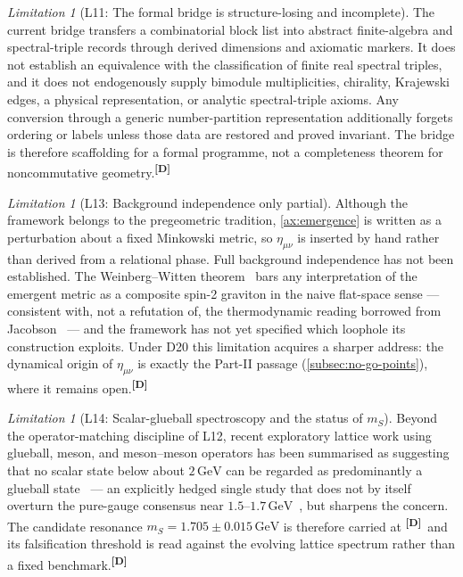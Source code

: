 \documentclass[12pt,a4paper,twoside]{article}
\theoremstyle{plain}
\theoremstyle{definition}
\theoremstyle{remark}
\newtheorem{limitation}[theorem]{Limitation}
\newcommand{\GeV}{\,\mathrm{GeV}}
\newcommand{\catmark}[1]{\textsuperscript{\textsf{\textbf{[#1]}}}}
\begin{document}
\begin{limitation}[L11: The formal bridge is structure-losing and incomplete]
\label{lim:L11}
The current bridge transfers a combinatorial block list into abstract
finite-algebra and spectral-triple records through derived dimensions
and axiomatic markers. It does not establish an equivalence with the
classification of finite real spectral triples, and it does not
endogenously supply bimodule multiplicities, chirality, Krajewski edges,
a physical representation, or analytic spectral-triple axioms. Any
conversion through a generic number-partition representation additionally
forgets ordering or labels unless those data are restored and proved
invariant. The bridge is therefore scaffolding for a formal programme,
not a completeness theorem for noncommutative geometry.\catmark{D}
\end{limitation}

\begin{limitation}[L13: Background independence only partial]
\label{lim:L13}
Although the framework belongs to the pregeometric tradition,
\cref{ax:emergence} is written as a perturbation about a fixed Minkowski
metric, so $\eta_{\mu\nu}$ is inserted by hand rather than derived from
a relational phase. Full background independence has not been
established. The Weinberg--Witten theorem~\cite{weinbergwitten1980} bars any interpretation of the
emergent metric as a composite spin-2 graviton in the naive flat-space
sense --- consistent with, not a refutation of, the thermodynamic
reading borrowed from Jacobson~\cite{jenkins2009,carlip2014} --- and the framework has not yet
specified which loophole its construction exploits. Under D20 this
limitation acquires a sharper address: the dynamical origin of
$\eta_{\mu\nu}$ is exactly the Part-II passage
(\cref{subsec:no-go-points}), where it remains open.\catmark{D}
\end{limitation}

\begin{limitation}[L14: Scalar-glueball spectroscopy and the status of $m_S$]
\label{lim:L14}
Beyond the operator-matching discipline of L12, recent exploratory
lattice work using glueball, meson, and meson--meson operators has been
summarised as suggesting that no scalar state below about
$2\,\mathrm{GeV}$ can be regarded as predominantly a glueball state~\cite{morningstar2024} ---
an explicitly hedged single study that does not by itself overturn the
pure-gauge consensus near $1.5$--$1.7\,\mathrm{GeV}$~\cite{athenodorou2020,morningstar1999}, but sharpens the
concern. The candidate resonance $m_S = 1.705 \pm 0.015\GeV$ is
therefore carried at \catmark{D}\ and its falsification threshold is
read against the evolving lattice spectrum rather than a fixed
benchmark.\catmark{D}
\end{limitation}
\end{document}
